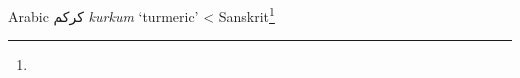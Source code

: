 \begin{etymology}\label{ety:kurkum}
Arabic {كركم} \textit{kurkum} `turmeric'
< Sanskrit\footnote{}
\end{etymology}